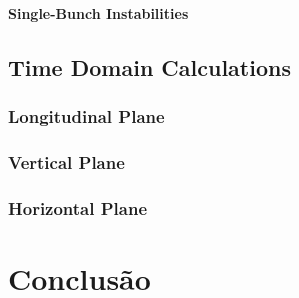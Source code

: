 \subsubsection{Single-Bunch Instabilities}
\section{Time Domain Calculations}
\subsection{Longitudinal Plane}
\subsection{Vertical Plane}
\subsection{Horizontal Plane}


%

\chapter*[Conclusão]{Conclusão}
\lipsum[1-5]


\postextual

% 
% 
% 



